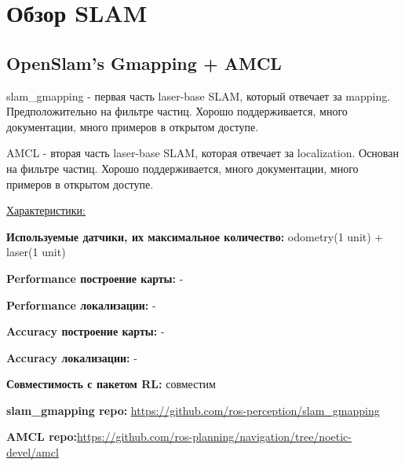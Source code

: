 \documentclass[a4paper, 14pt]{extreport}
\begin{document}
\section{Обзор SLAM}
\subsection{OpenSlam's Gmapping + AMCL}
\par slam\_gmapping - первая часть laser-base SLAM, который отвечает за mapping. Предположительно на фильтре частиц. Хорошо поддерживается, много документации, много примеров в открытом доступе.
\par\noindent AMCL - вторая часть laser-base SLAM, которая отвечает за localization. Основан на фильтре частиц. Хорошо поддерживается, много документации, много примеров в открытом доступе.
\vspace{2mm}
\par\noindent \underline{Характеристики:}
\par\textbf{Используемые датчики, их максимальное количество:} odometry(1 unit) + laser(1 unit)
\par\textbf{Performance построение карты:} -
\par\textbf{Performance локализации:} -
\par\textbf{Accuracy построение карты:} -
\par\textbf{Accuracy локализации:} -
\par\textbf{Совместимость с пакетом RL:} совместим
\par\textbf{slam\_gmapping repo:} \hspace{1mm}\url{https://github.com/ros-perception/slam_gmapping}
\par\textbf{AMCL repo:}\hspace{1mm}\url{https://github.com/ros-planning/navigation/tree/noetic-devel/amcl}
\end{document}
